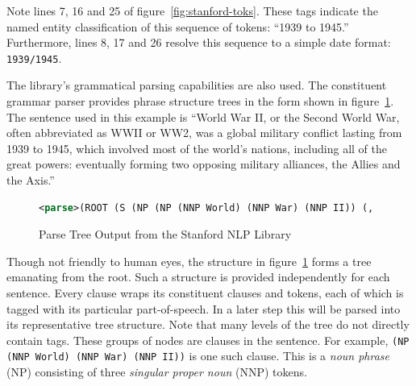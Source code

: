 Note lines 7, 16 and 25 of figure~\ref{fig:stanford-toks}.  These tags indicate the named entity classification of this sequence of tokens: ``1939 to 1945.''  Furthermore, lines 8, 17 and 26 resolve this sequence to a simple date format: \verb|1939/1945|.

The library's grammatical parsing capabilities are also used.  The constituent grammar parser provides phrase structure trees in the form shown in figure~\ref{fig:stanford-parse}.  The sentence used in this example is ``World War II, or the Second World War, often abbreviated as WWII or WW2, was a global military conflict lasting from 1939 to 1945, which involved most of the world's nations, including all of the great powers: eventually forming two opposing military alliances, the Allies and the Axis.''

\begin{figure}
\begin{lstlisting}[language=xml,style=mystyle,stringstyle=\color{black}]
<parse>(ROOT (S (NP (NP (NNP World) (NNP War) (NNP II)) (, ,) (CC or) (NP (NP (DT the) (NNP Second) (NNP World) (NNP War)) (-LRB- -LRB-) (NP (CD 1)) (-RRB- -RRB-) (-LRB- -LRB-) (ADJP (RB often) (JJ abbreviated) (PP (IN as) (NP (NNP WWII) (CC or) (NNP WW2)))) (-RRB- -RRB-)) (, ,)) (VP (VBD was) (NP (NP (DT a) (JJ global) (JJ military) (NN conflict)) (VP (VBG lasting) (PP (IN from) (NP (NP (CD 1939) (TO to) (CD 1945)) (, ,) (SBAR (WHNP (WDT which)) (S (VP (VBD involved) (NP (NP (JJS most)) (PP (IN of) (NP (NP (DT the) (NN world) (POS 's)) (NNS nations)))) (, ,) (PP (VBG including) (NP (NP (DT all)) (PP (IN of) (NP (NP (DT the) (JJ great) (NNS powers)) (: :) (S (ADVP (RB eventually)) (VP (VBG forming) (NP (CD two)) (S (VP (VBG opposing) (NP (NP (JJ military) (NNS alliances)) (, ,) (NP (DT the) (NNS Allies)) (CC and) (NP (DT the) (NNP Axis))))))))))))))))))) (. .))) </parse>
\end{lstlisting}
\caption{Parse Tree Output from the Stanford NLP Library}
\label{fig:stanford-parse}
\end{figure}

Though not friendly to human eyes, the structure in figure~\ref{fig:stanford-parse} forms a tree emanating from the root.  Such a structure is provided independently for each sentence.  Every clause wraps its constituent clauses and tokens, each of which is tagged with its particular part-of-speech.  In a later step this will be parsed into its representative tree structure.  Note that many levels of the tree do not directly contain tags.  These groups of nodes are clauses in the sentence.  For example, \verb|(NP (NNP World) (NNP War) (NNP II))| is one such clause.  This is a \emph{noun phrase} (NP) consisting of three \emph{singular proper noun} (NNP) tokens.


